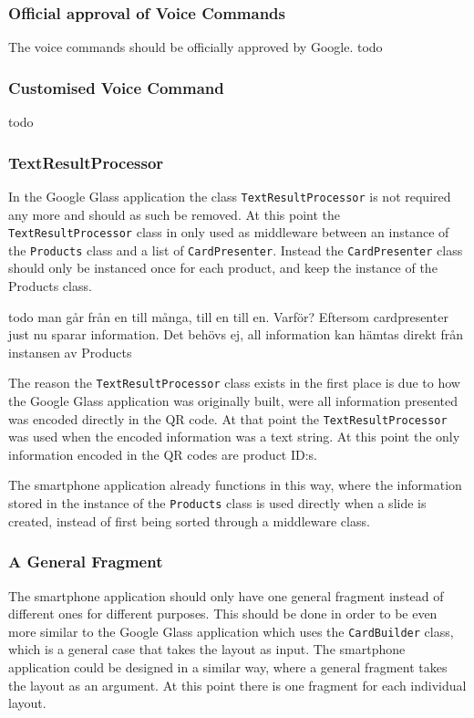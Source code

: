 \subsubsection{Official approval of Voice Commands}
The voice commands should be officially approved by Google.
todo
\subsubsection{Customised Voice Command}
todo
\subsubsection{TextResultProcessor}
In the Google Glass application the class \texttt{TextResultProcessor} is not required any more and should as such be removed. At this point the \texttt{TextResultProcessor} class in only used as middleware between an instance of the \texttt{Products} class and a list of \texttt{CardPresenter}. Instead the \texttt{CardPresenter} class should only be instanced once for each product, and keep the instance of the Products class.

todo man går från en till många, till en till en. Varför? Eftersom cardpresenter just nu sparar information. Det behövs ej, all information kan hämtas direkt från instansen av Products

The reason the \texttt{TextResultProcessor} class exists in the first place is due to how the Google Glass application was originally built, were all information presented was encoded directly in the QR code. At that point the \texttt{TextResultProcessor} was used when the encoded information was a text string. At this point the only information encoded in the QR codes are product ID:s.

The smartphone application already functions in this way, where the information stored in the instance of the \texttt{Products} class is used directly when a slide is created, instead of first being sorted through a middleware class.


\subsubsection{A General Fragment}
The smartphone application should only have one general fragment instead of different ones for different purposes. This should be done in order to be even more similar to the Google Glass application which uses the \texttt{CardBuilder} class, which is a general case that takes the layout as input. The smartphone application could be designed in a similar way, where a general fragment takes the layout as an argument. At this point there is one fragment for each individual layout.
